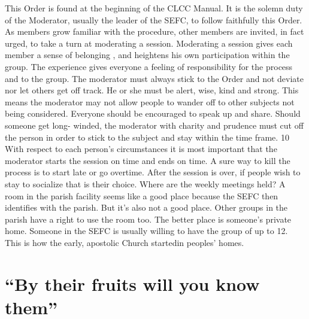 \documentclass{article}
\begin{document}
This Order is found at the beginning of the CLCC Manual. It is the solemn duty
of the Moderator, usually the leader of the SEFC, to follow faithfully this
Order. As members grow familiar with the procedure, other members are invited,
in fact urged, to take a turn at moderating a session. Moderating a session
gives each member a sense of belonging , and heightens his own participation
within the group. The experience gives everyone a feeling of responsibility for
the process and to the group.
The moderator must always stick to the Order and not deviate nor let others get
off track. He or she must be alert, wise, kind and strong. This means the
moderator may not allow people to wander off to other subjects not being
considered. Everyone should be encouraged to speak up and share. Should someone
get long- winded, the moderator with charity and prudence must cut off the
person in order to stick to the subject and stay within the time frame.
10
With respect to each person's circumstances it is most important that the
moderator starts the session on time and ends on time. A sure way to kill the
process is to start late or go overtime. After the session is over, if people
wish to stay to socialize that is their choice.
Where are the weekly meetings held? A room in the parish facility seems like a
good place because the SEFC then identifies with the parish. But it's also not a
good place. Other groups in the parish have a right to use the room too. The
better place is someone's private home. Someone in the SEFC is usually willing
to have the group of up to 12. This is how the early, apostolic Church startedin
peoples' homes.

\section{``By their fruits will you know them''}
\end{document}

